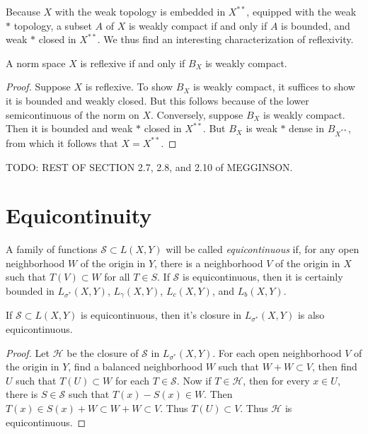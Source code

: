 Because $X$ with the weak topology is embedded in $X^{**}$, equipped with the weak $*$ topology, a subset $A$ of $X$ is weakly compact if and only if $A$ is bounded, and weak $*$ closed in $X^{**}$. We thus find an interesting characterization of reflexivity.

\begin{theorem}
    A norm space $X$ is reflexive if and only if $B_X$ is weakly compact.
\end{theorem}
\begin{proof}
    Suppose $X$ is reflexive. To show $B_X$ is weakly compact, it suffices to show it is bounded and weakly closed. But this follows because of the lower semicontinuous of the norm on $X$. Conversely, suppose $B_X$ is weakly compact. Then it is bounded and weak $*$ closed in $X^{**}$. But $B_X$ is weak $*$ dense in $B_{X^{**}}$, from which it follows that $X = X^{**}$.
\end{proof}

TODO: REST OF SECTION 2.7, 2.8, and 2.10 of MEGGINSON.

\section{Equicontinuity}

A family of functions $\mathcal{S} \subset L(X,Y)$ will be called \emph{equicontinuous} if, for any open neighborhood $W$ of the origin in $Y$, there is a neighborhood $V$ of the origin in $X$ such that $T(V) \subset W$ for all $T \in S$. If $\mathcal{S}$ is equicontinuous, then it is certainly bounded in $L_{\sigma^*}(X,Y)$, $L_\gamma(X,Y)$, $L_c(X,Y)$, and $L_b(X,Y)$.

\begin{theorem}
    If $\mathcal{S} \subset L(X,Y)$ is equicontinuous, then it's closure in $L_{\sigma^*}(X,Y)$ is also equicontinuous.
\end{theorem}
\begin{proof}
    Let $\mathcal{H}$ be the closure of $\mathcal{S}$ in $L_{\sigma^*}(X,Y)$. For each open neighborhood $V$ of the origin in $Y$, find a balanced neighborhood $W$ such that $W + W \subset V$, then find $U$ such that $T(U) \subset W$ for each $T \in \mathcal{S}$. Now if $T \in \mathcal{H}$, then for every $x \in U$, there is $S \in \mathcal{S}$ such that $T(x) - S(x) \in W$. Then $T(x) \in S(x) + W \subset W + W \subset V$. Thus $T(U) \subset V$. Thus $\mathcal{H}$ is equicontinuous.
\end{proof}

